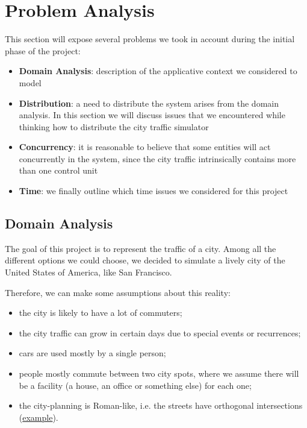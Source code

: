 \section{Problem Analysis}

This section will expose several problems we took in account during the
initial phase of the project:

\begin{itemize}
\item \textbf{Domain Analysis}: description of the applicative context we
  considered to model
\item \textbf{Distribution}: a need to distribute the system arises from the
  domain analysis. In this section we will discuss issues that we encountered
  while thinking how to distribute the city traffic simulator
\item \textbf{Concurrency}: it is reasonable to believe that some entities
  will act concurrently in the system, since the city traffic intrinsically
  contains more than one control unit
\item \textbf{Time}: we finally outline which time issues we considered for
  this project
\end{itemize}

\subsection{Domain Analysis}\label{sec:pa-domain}
The goal of this project is to represent the traffic of a city. Among all the
different options we could choose, we decided to simulate a lively city of
the United States of America, like San Francisco.

Therefore, we can make some assumptions about this reality:

\begin{itemize}
\item the city is likely to have a lot of commuters;
\item the city traffic can grow in certain days due to special events or
  recurrences;
\item cars are used mostly by a single person;
\item people mostly commute between two city spots, where we assume there
  will be a facility (a house, an office or something else) for each one;
\item the city-planning is Roman-like, i.e. the streets have orthogonal
  intersections (\href{https://www.google.it/maps/place/San+Francisco,+California,+Stati+Uniti/@37.7766566,-122.4330836,16z/data=!4m2!3m1!1s0x80859a6d00690021:0x4a501367f076adff}{example}).
\end{itemize}

